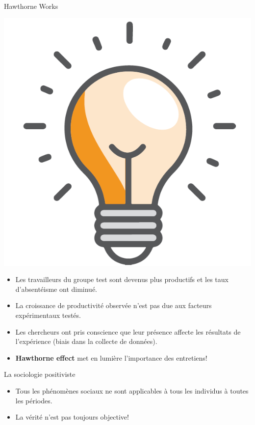 \documentclass[10pt]{beamer}
\begin{document}
\begin{frame}{Hawthorne Works}

        \center\includegraphics[width=.3\textwidth]{light}
        \begin{itemize}
            \item<2->{Les travailleurs du groupe test sont devenus plus productifs et les taux d'absentéisme ont diminué.}
            \item<3->{La croissance de productivité observée n'est pas due aux facteurs expérimentaux testés.}
            \item<4->{Les chercheurs ont pris conscience que leur présence affecte les résultats de l'expérience (biais dans la collecte de données).}
            \item<5->[\faLightbulb]\alert{\textbf{Hawthorne effect} met en lumière l'importance des entretiens!}
        \end{itemize}
\end{frame}

\begin{frame}{La sociologie positiviste}
    \begin{itemize}
        \item<3-> Tous les phénomènes sociaux ne sont applicables à tous les individus à toutes les périodes.
        \item<4-> La vérité n'est pas toujours objective!
    \end{itemize}
\end{frame}
\end{document}
